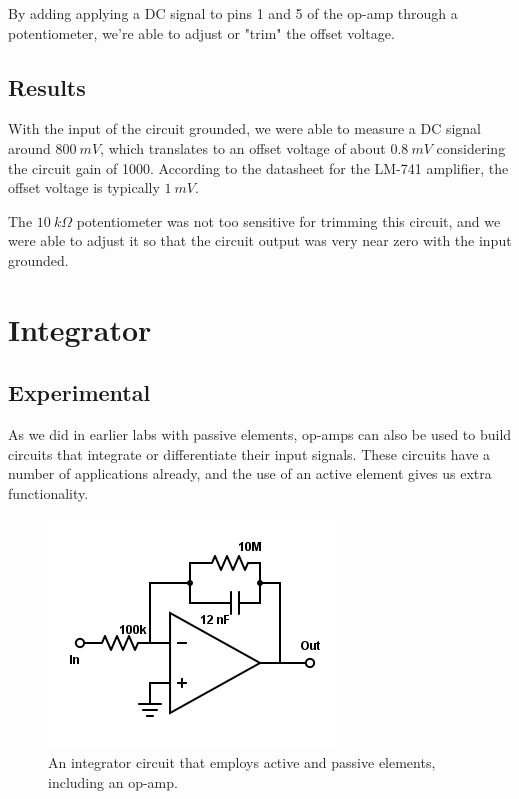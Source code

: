 \documentclass[11pt]{article}
\begin{document}
By adding applying a DC signal to pins 1 and 5 of the op-amp through a potentiometer, we're able to adjust or "trim" the offset voltage. 


\subsection{Results}

With the input of the circuit grounded, we were able to measure a DC signal around $800\ mV$, which translates to an offset voltage of about $0.8\ mV$ considering the circuit gain of 1000. According to the datasheet for the LM-741 amplifier, the offset voltage is typically $1\ mV$. 

The $10\ k \Omega$ potentiometer was not too sensitive for trimming this circuit, and we were able to adjust it so that the circuit output was very near zero with the input grounded.


\section{Integrator}
\subsection{Experimental}

As we did in earlier labs with passive elements, op-amps can also be used to build circuits that integrate or differentiate their input signals. These circuits have a number of applications already, and the use of an active element gives us extra functionality.

\begin{figure}[H]
    \centering
    \includegraphics[scale=0.5]{Diagrams/c-c.png}
    \caption{An integrator circuit that employs active and passive elements, including an op-amp.}
    \label{circuit:c}
\end{figure}
\end{document}
